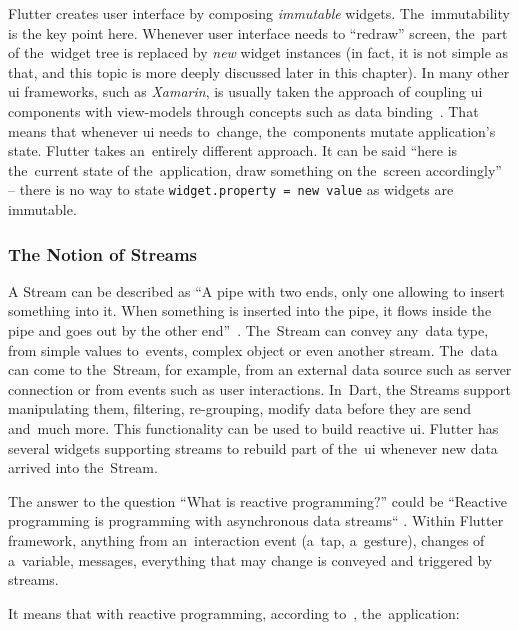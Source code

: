 Flutter creates user interface by composing \textit{immutable} widgets. The~immutability is the key point here. Whenever user interface needs to ``redraw'' screen, the~part of the~widget tree is replaced by \textit{new} widget instances (in fact, it is not simple as that, and this topic is more deeply discussed later in this chapter). In many other \gls{ui} frameworks, such as \textit{Xamarin}, is usually taken the approach of coupling \gls{ui} components with view-models through concepts such as data binding~\cite{xamarin-data-binding}. That means that whenever \gls{ui} needs to~change, the~components mutate application's state. Flutter takes an~entirely different approach. It can be said ``here is the~current state of the~application, draw something on the~screen accordingly'' -- there is no way to state \verb|widget.property = new value| as widgets are immutable.

\subsubsection{The Notion of Streams}
A Stream can be described as ``A pipe with two ends, only one allowing to insert something into it. When something is inserted into the pipe, it flows inside the pipe and goes out by the other end''~\cite{reactive-didier}. The~Stream can convey any~data type, from simple values to~events, complex object or even another stream. The~data can come to the~Stream, for example, from an external data source such as server connection or from events such as user interactions. In~Dart, the Streams support manipulating them, filtering, re-grouping, modify data before they are send and~much more. This functionality can be used to build reactive \gls{ui}. Flutter has several widgets supporting streams to rebuild part of the~\gls{ui} whenever new data arrived into the~Stream.

The answer to the question ``What is reactive programming$?$'' could be ``Reactive programming is programming with asynchronous data streams`` \cite{reactive-didier}\cite{reactive-red-hat}. Within Flutter framework, anything from an~interaction event (a~tap, a~gesture), changes of a~variable, messages, everything that may change is conveyed and triggered by streams.

It means that with reactive programming, according to~\cite{reactive-didier}, the~application:


